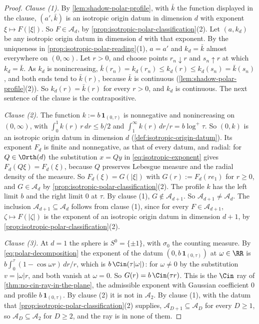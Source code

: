 \begin{proof}
\leanok
\emph{Clause (1).} By \ref{lem:shadow-polar-profile}, with $\bar k$ the function displayed in
the clause, $(a',\bar k)$ is an isotropic origin datum in dimension $d$ with exponent
$\xi \mapsto F(|\xi|)$. So $F \in \mathcal{A}_d$, by
\ref{prop:isotropic-polar-classification}(2). Let $(a,k_d)$ be any isotropic origin datum in
dimension $d$ with that exponent. By the uniqueness in \ref{prop:isotropic-polar-reading}(1),
$a = a'$ and $k_d = \bar k$ almost everywhere on $(0,\infty)$. Let $r > 0$, and choose points
$r_n \downarrow r$ and $s_n \uparrow r$ at which $k_d = \bar k$. As $k_d$ is nonincreasing,
$\bar k(r_n) = k_d(r_n) \le k_d(r) \le k_d(s_n) = \bar k(s_n)$, and both ends tend to
$\bar k(r)$, because $\bar k$ is continuous (\ref{lem:shadow-polar-profile}(2)). So
$k_d(r) = \bar k(r)$ for every $r > 0$, and $k_d$ is continuous. The next sentence of the clause
is the contrapositive.

\emph{Clause (2).} The function $k := b\,\mathbf 1_{(0,\tau)}$ is nonnegative and nonincreasing
on $(0,\infty)$, with $\int_0^1 k(r)\,r\,dr \le b/2$ and
$\int_1^\infty k(r)\,dr/r = b\log^+\tau$. So $(0,k)$ is an isotropic origin datum in dimension
$d$ (\ref{def:isotropic-origin-datum}). Its exponent $F_d$ is finite and nonnegative, as that
of every datum, and radial: for
$Q \in \Orth(d)$ the substitution $x = Qy$ in \ref{eq:isotropic-exponent} gives
$F_d(Q\xi) = F_d(\xi)$, because $Q$ preserves Lebesgue measure and the radial density of the
\Levy{} measure. So $F_d(\xi) = G(|\xi|)$ with $G(r) := F_d(re_1)$ for $r \ge 0$, and
$G \in \mathcal{A}_d$ by \ref{prop:isotropic-polar-classification}(2). The profile $k$ has the
left limit $b$ and the right limit $0$ at $\tau$. By clause (1), $G \notin \mathcal{A}_{d+1}$.
So $\mathcal{A}_{d+1} \ne \mathcal{A}_d$. The inclusion
$\mathcal{A}_{d+1} \subseteq \mathcal{A}_d$ follows from clause (1), since for every
$F \in \mathcal{A}_{d+1}$, $\zeta \mapsto F(|\zeta|)$ is the exponent of an isotropic origin datum
in dimension $d + 1$, by \ref{prop:isotropic-polar-classification}(2).

\emph{Clause (3).} At $d = 1$ the sphere is $S^0 = \{\pm1\}$, with $\sigma_0$ the counting
measure. By \ref{eq:polar-decomposition} the exponent of the datum
$(0, b\,\mathbf 1_{(0,\tau)})$ at $\omega \in \RR$ is
$b\int_0^\tau(1 - \cos\omega r)\,dr/r$, which is $b\,\Cin(\tau|\omega|)$: for $\omega \ne 0$ by
the substitution $v = |\omega| r$, and both vanish at $\omega = 0$. So
$G(r) = b\,\Cin(\tau r)$.
This is the $\Cin$ ray of \ref{thm:no-cin-ray-in-the-plane}, the admissible exponent with
Gaussian coefficient $0$ and profile $b\,\mathbf 1_{(0,\tau)}$. By clause (2) it is not in
$\mathcal{A}_2$. By clause (1), with the datum that
\ref{prop:isotropic-polar-classification}(2) supplies,
$\mathcal{A}_{D+1} \subseteq \mathcal{A}_D$ for every $D \ge 1$, so
$\mathcal{A}_D \subseteq \mathcal{A}_2$ for $D \ge 2$, and the ray is in none of them.


\end{proof}
